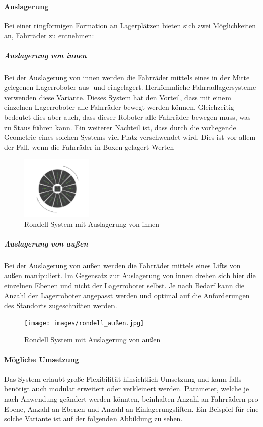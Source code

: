 \clearpage
\paragraph{Auslagerung} Bei einer ringförmigen Formation an Lagerplätzen bieten sich zwei Möglichkeiten an, Fahrräder zu entnehmen:

\subparagraph{Auslagerung von innen} Bei der Auslagerung von innen werden die Fahrräder mittels eines in der Mitte gelegenen Lagerroboter aus- und eingelagert. Herkömmliche Fahrradlagersysteme verwenden diese Variante. Dieses System hat den Vorteil, dass mit einem einzelnen Lagerroboter alle Fahrräder bewegt werden können. Gleichzeitig bedeutet dies aber auch, dass dieser Roboter alle Fahrräder bewegen muss, was zu Staus führen kann. Ein weiterer Nachteil ist, dass durch die vorliegende Geometrie eines solchen Systems viel Platz verschwendet wird. Dies ist vor allem der Fall, wenn die Fahrräder in Boxen gelagert Werten

\begin{figure}[H]
  \centering
  \includegraphics[width=0.3\textwidth]{images/rondell_innen.jpg}
  \caption{Rondell System mit Auslagerung von innen}
  \label{fig:rondell_innen}
\end{figure}

\subparagraph{Auslagerung von außen} Bei der Auslagerung von außen werden die Fahrräder mittels eines Lifts von außen manipuliert. Im Gegensatz zur Auslagerung von innen drehen sich hier die einzelnen Ebenen und nicht der Lagerroboter selbst. Je nach Bedarf kann die Anzahl der Lagerroboter angepasst werden und optimal auf die Anforderungen des Standorts zugeschnitten werden.

\begin{figure}[H]
  \centering
  \texttt{[image: images/rondell\_außen.jpg]}
  \caption{Rondell System mit Auslagerung von außen}
  \label{fig:rondell_außen}
\end{figure}

\clearpage
\paragraph{Mögliche Umsetzung} Das System erlaubt große Flexibilität hinsichtlich Umsetzung und kann falls benötigt auch modular erweitert oder verkleinert werden. Parameter, welche je nach Anwendung geändert werden könnten, beinhalten Anzahl an Fahrrädern pro Ebene, Anzahl an Ebenen und Anzahl an Einlagerungsliften. Ein Beispiel für eine solche Variante ist auf der folgenden Abbildung zu sehen.

